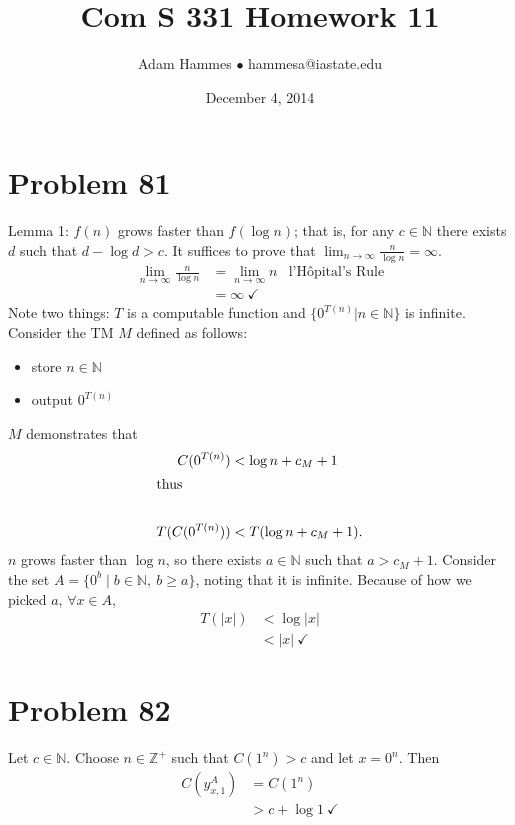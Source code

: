 \documentclass[11pt]{article}
\let\imp\rightarrow
\begin{document}
\title{Com S 331 Homework 11}
\author{Adam Hammes $\bullet$ hammesa@iastate.edu}
\date{December 4, 2014}
\maketitle


\section*{Problem 81}

Lemma 1: $f(n)$ grows faster than $f( \log n)$; that is, for any $c \in \mathbb{N}$ there exists $d$ such that $d - \log d > c$. 
It suffices to prove that $\lim _{n \imp \infty} \frac{n}{\log n}= \infty$.
	\begin{align*}
		\lim _{n \imp \infty} \frac{n}{\log n}  &= \lim _{n \imp \infty} n &\text{l'H\^{o}pital's Rule} \\
		&= \infty \ \checkmark
	\end{align*}
Note two things: $T$ is a computable function and $\{ 0^{T(n)} | n \in \mathbb{N} \}$ is infinite.
Consider the TM $M$ defined as follows:
	\begin{itemize}
		\item store $n \in \mathbb{N}$
		\item output $0^{T(n)}$
	\end{itemize}
$M$ demonstrates that
	\begin{align*}
		C( 0^{T(n)} ) &< \log n + c_M + 1 \\
		\intertext{thus} \\
		T( C( 0^{T(n)}) ) &< T( \log n + c_M +1 ).
	\end{align*}
$n$ grows faster than $\log n$, so there exists $a \in \mathbb{N}$ such that $a > c_M + 1$.
Consider the set $A = \{ 0^b \mid b \in \mathbb{N},\ b \geq a \}$, noting that it is infinite.
Because of how we picked $a$, $\forall x \in A$,
	\begin{align*}
		T(|x|) &< \log |x| \\
		&< |x| \ \checkmark
	\end{align*}


\section*{Problem 82}

Let $c \in \mathbb{N}$. Choose $n \in \mathbb{Z}^+$ such that $C(1^n) > c$ and let $x = 0^n$.
Then
	\begin{align*}
		C(y_{x,1} ^A) &= C(1^n) \\
		&> c + \log 1 \ \checkmark
	\end{align*}
\end{document}
